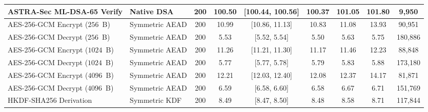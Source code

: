 \begin{table}[t]
\begin{tabular}{llccccccc}
\textbf{ASTRA-Sec ML-DSA-65 Verify} & Native DSA & 200 & 100.50 & [100.44, 100.56] & 100.37 & 101.05 & 101.80 & \textbf{9,950} \\
\hline
AES-256-GCM Encrypt ($256$~B) & Symmetric AEAD & 200 & 10.99 & [10.86, 11.13] & 10.83 & 11.08 & 13.93 & 90,951 \\
AES-256-GCM Decrypt ($256$~B) & Symmetric AEAD & 200 & 5.53 & [5.52, 5.54] & 5.50 & 5.63 & 5.75 & 180,886 \\
AES-256-GCM Encrypt ($1024$~B) & Symmetric AEAD & 200 & 11.26 & [11.21, 11.30] & 11.17 & 11.46 & 12.23 & 88,848 \\
AES-256-GCM Decrypt ($1024$~B) & Symmetric AEAD & 200 & 5.77 & [5.77, 5.78] & 5.79 & 5.83 & 5.88 & 173,180 \\
AES-256-GCM Encrypt ($4096$~B) & Symmetric AEAD & 200 & 12.21 & [12.03, 12.40] & 12.08 & 12.37 & 14.17 & 81,871 \\
AES-256-GCM Decrypt ($4096$~B) & Symmetric AEAD & 200 & 6.59 & [6.58, 6.60] & 6.58 & 6.67 & 6.71 & 151,769 \\
HKDF-SHA256 Derivation & Symmetric KDF & 200 & 8.49 & [8.47, 8.50] & 8.48 & 8.58 & 8.71 & 117,844 \\
\hline
\end{tabular}
\end{table}
